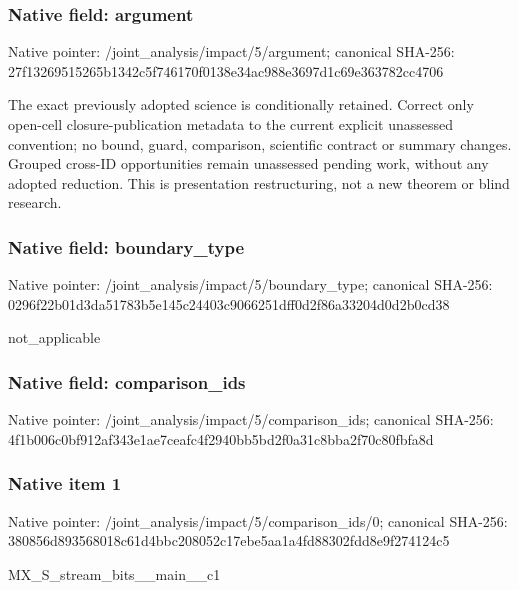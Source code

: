 \documentclass[10pt,a4paper]{article}
\begin{document}
\subsubsection{Native field: argument}
Native pointer: /joint\_\allowbreak{}analysis/impact/5/argument; canonical SHA-256: 27f13269515265b1342c5f746170f0138e34ac988e3697d1c69e363782cc4706

\begingroup\raggedright\sloppy The exact previously adopted science is conditionally retained. Correct only open-cell closure-publication metadata to the current explicit unassessed convention;\allowbreak{} no bound,\allowbreak{} guard,\allowbreak{} comparison,\allowbreak{} scientific contract or summary changes. Grouped cross-ID opportunities remain unassessed pending work,\allowbreak{} without any adopted reduction. This is presentation restructuring,\allowbreak{} not a new theorem or blind research.\par\endgroup

\subsubsection{Native field: boundary\_\allowbreak{}type}
Native pointer: /joint\_\allowbreak{}analysis/impact/5/boundary\_\allowbreak{}type; canonical SHA-256: 0296f22b01d3da51783b5e145c24403c9066251dff0d2f86a33204d0d2b0cd38

\begingroup\raggedright\sloppy not\_\allowbreak{}applicable\par\endgroup

\subsubsection{Native field: comparison\_\allowbreak{}ids}
Native pointer: /joint\_\allowbreak{}analysis/impact/5/comparison\_\allowbreak{}ids; canonical SHA-256: 4f1b006c0bf912af343e1ae7ceafc4f2940bb5bd2f0a31c8bba2f70c80fbfa8d

\subsubsection{Native item 1}
Native pointer: /joint\_\allowbreak{}analysis/impact/5/comparison\_\allowbreak{}ids/0; canonical SHA-256: 380856d893568018c61d4bbc208052c17ebe5aa1a4fd88302fdd8e9f274124c5

\begingroup\raggedright\sloppy MX\_\allowbreak{}S\_\allowbreak{}stream\_\allowbreak{}bits\_\allowbreak{}\_\allowbreak{}main\_\allowbreak{}\_\allowbreak{}c1\par\endgroup
\end{document}
